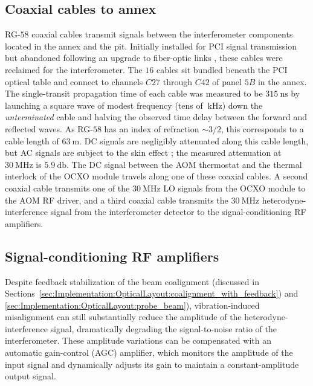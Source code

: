 \subsection{Coaxial cables to \diiid\space annex}
\label{sec:Implementation:Hardware:coax}
RG-$58$ coaxial cables transmit signals
between the interferometer components
located in the \diiid\space annex and the \diiid\space pit.
Initially installed for PCI signal transmission but
abandoned following an upgrade to fiber-optic links
\cite[Sec.~3.3.3]{dorris_phd},
these cables were reclaimed for the interferometer.
The $16$ cables sit bundled beneath the PCI optical table and
connect to channels $C27$ through $C42$
of panel $5B$ in the \diiid\space annex.
The single-transit propagation time of each cable
was measured to be $\SI{315}{\nano\second}$
by launching a square wave of modest frequency
(tens of $\SI{}{\kilo\hertz}$)
down the \emph{unterminated} cable and
halving the observed time delay between the forward and reflected waves.
As RG-$58$ has an index of refraction $\sim 3 / 2$,
this corresponds to a cable length of $\SI{63}{\meter}$.
DC signals are negligibly attenuated along this cable length, but
AC signals are subject to the skin effect
\cite[Sec.~H.1.4]{horowitz_and_hill};
the measured attenuation at $\SI{30}{\mega\hertz}$ is $\SI{5.9}{\decibel}$.
The DC signal between the AOM thermostat and
the thermal interlock of the OCXO module
travels along one of these coaxial cables.
A second coaxial cable transmits
one of the $\SI{30}{\mega\hertz}$ LO signals
from the OCXO module
to the AOM RF driver, and
a third coaxial cable transmits
the $\SI{30}{\mega\hertz}$ heterodyne-interference signal
from the interferometer detector
to the signal-conditioning RF amplifiers.


\subsection{Signal-conditioning RF amplifiers}
\label{sec:Implementation:Hardware:RF_amps}
Despite feedback stabilization of the beam coalignment
(discussed in
Sections~\ref{sec:Implementation:OpticalLayout:coalignment_with_feedback})
and \ref{sec:Implementation:OpticalLayout:probe_beam}),
vibration-induced misalignment can still substantially reduce
the amplitude of the heterodyne-interference signal,
dramatically degrading the signal-to-noise ratio of the interferometer.
These amplitude variations can be compensated
with an automatic gain-control (AGC) amplifier, which
monitors the amplitude of the input signal and
dynamically adjusts its gain
to maintain a constant-amplitude output signal.

